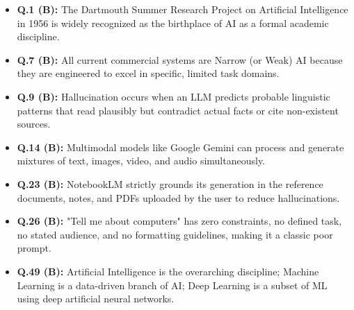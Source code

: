 \begin{expbox}
\begin{itemize}[leftmargin=5mm]
    \item \textbf{Q.1 (B):} The Dartmouth Summer Research Project on Artificial Intelligence in 1956 is widely recognized as the birthplace of AI as a formal academic discipline.
    \item \textbf{Q.7 (B):} All current commercial systems are Narrow (or Weak) AI because they are engineered to excel in specific, limited task domains.
    \item \textbf{Q.9 (B):} Hallucination occurs when an LLM predicts probable linguistic patterns that read plausibly but contradict actual facts or cite non-existent sources.
    \item \textbf{Q.14 (B):} Multimodal models like Google Gemini can process and generate mixtures of text, images, video, and audio simultaneously.
    \item \textbf{Q.23 (B):} NotebookLM strictly grounds its generation in the reference documents, notes, and PDFs uploaded by the user to reduce hallucinations.
    \item \textbf{Q.26 (B):} "Tell me about computers" has zero constraints, no defined task, no stated audience, and no formatting guidelines, making it a classic poor prompt.
    \item \textbf{Q.49 (B):} Artificial Intelligence is the overarching discipline; Machine Learning is a data-driven branch of AI; Deep Learning is a subset of ML using deep artificial neural networks.
\end{itemize}
\end{expbox}

\newpage

